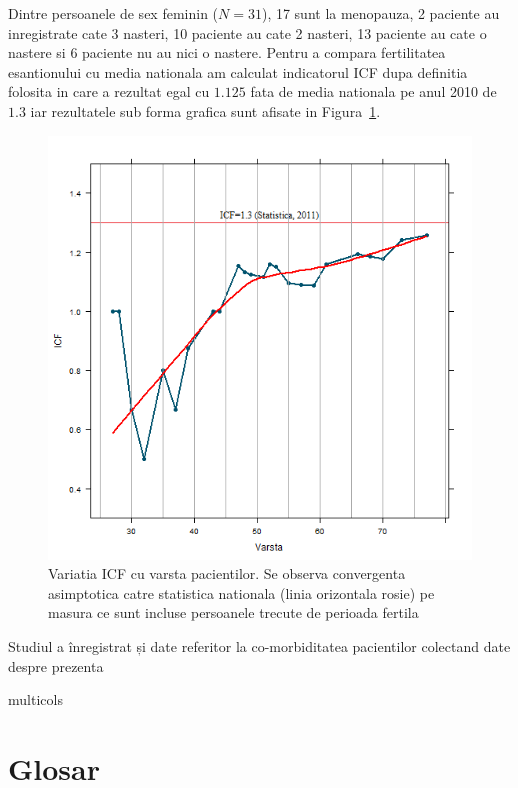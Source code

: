 \documentclass[11pt,draft]{article}
\makeatletter
\def\closeopenmulticols{%
   \def\@tempa{multicols}%
   \ifx\@tempa\@currenvir
      \end{multicols}%
  \fi 
}
\makeatother
\begin{document}
  \begin{multicols}{2}
  Dintre persoanele de sex feminin ($N=31$), 17 sunt la menopauza, 2 paciente au inregistrate cate 3 nasteri, 10 paciente au cate 2 nasteri, 13 paciente au cate o nastere si 6 paciente nu au nici o nastere. Pentru a compara fertilitatea esantionului cu media nationala am calculat indicatorul \ac{ICF} dupa definitia folosita in \citep{insee2011} care a rezultat egal cu $1.125$ fata de media nationala pe anul 2010 de $1.3$ iar rezultatele sub forma grafica sunt afisate in Figura~\ref{fig:incoNasteriICF}.
  \begin{figure}[H]
    \centering
    \includegraphics[width=0.8\linewidth]{incoNasteriICF}
    \caption{Variatia ICF cu varsta pacientilor. Se observa convergenta asimptotica catre statistica nationala (linia orizontala rosie) pe masura ce sunt incluse persoanele trecute de perioada fertila }
    \label{fig:incoNasteriICF}
  \end{figure}
  
  Studiul a înregistrat și  date referitor la co-morbiditatea pacientilor colectand date despre prezenta 

  \closeopenmulticols
  
  
  
  \section*{Glosar}
  \begin{acronym}[LUTS]
  \end{acronym}
 
 \listoffigures
 \listoftables
   
\end{document}
